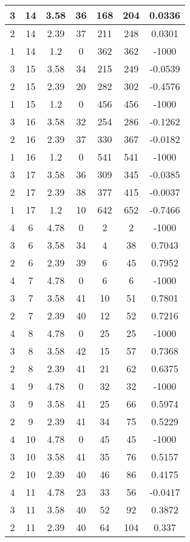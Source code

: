 \documentclass[letterpaper, 12pt]{article}
\begin{document}
\begin{longtable}{|c|c|c|c|c|c|c|}
\hline
3 & 14 & 3.58 & 36 & 168 & 204 & 0.0336 \\
\hline
2 & 14 & 2.39 & 37 & 211 & 248 & 0.0301 \\
\hline
1 & 14 & 1.2 & 0 & 362 & 362 & -1000 \\
\hline
3 & 15 & 3.58 & 34 & 215 & 249 & -0.0539 \\
\hline
2 & 15 & 2.39 & 20 & 282 & 302 & -0.4576 \\
\hline
1 & 15 & 1.2 & 0 & 456 & 456 & -1000 \\
\hline
3 & 16 & 3.58 & 32 & 254 & 286 & -0.1262 \\
\hline
2 & 16 & 2.39 & 37 & 330 & 367 & -0.0182 \\
\hline
1 & 16 & 1.2 & 0 & 541 & 541 & -1000 \\
\hline
3 & 17 & 3.58 & 36 & 309 & 345 & -0.0385 \\
\hline
2 & 17 & 2.39 & 38 & 377 & 415 & -0.0037 \\
\hline
1 & 17 & 1.2 & 10 & 642 & 652 & -0.7466 \\
\hline
4 & 6 & 4.78 & 0 & 2 & 2 & -1000 \\
\hline
3 & 6 & 3.58 & 34 & 4 & 38 & 0.7043 \\
\hline
2 & 6 & 2.39 & 39 & 6 & 45 & 0.7952 \\
\hline
4 & 7 & 4.78 & 0 & 6 & 6 & -1000 \\
\hline
3 & 7 & 3.58 & 41 & 10 & 51 & 0.7801 \\
\hline
2 & 7 & 2.39 & 40 & 12 & 52 & 0.7216 \\
\hline
4 & 8 & 4.78 & 0 & 25 & 25 & -1000 \\
\hline
3 & 8 & 3.58 & 42 & 15 & 57 & 0.7368 \\
\hline
2 & 8 & 2.39 & 41 & 21 & 62 & 0.6375 \\
\hline
4 & 9 & 4.78 & 0 & 32 & 32 & -1000 \\
\hline
3 & 9 & 3.58 & 41 & 25 & 66 & 0.5974 \\
\hline
2 & 9 & 2.39 & 41 & 34 & 75 & 0.5229 \\
\hline
4 & 10 & 4.78 & 0 & 45 & 45 & -1000 \\
\hline
3 & 10 & 3.58 & 41 & 35 & 76 & 0.5157 \\
\hline
2 & 10 & 2.39 & 40 & 46 & 86 & 0.4175 \\
\hline
4 & 11 & 4.78 & 23 & 33 & 56 & -0.0417 \\
\hline
3 & 11 & 3.58 & 40 & 52 & 92 & 0.3872 \\
\hline
2 & 11 & 2.39 & 40 & 64 & 104 & 0.337 \\

\end{longtable}
\end{document}
